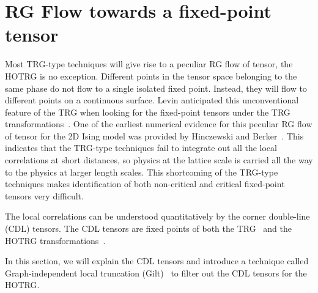 \documentclass[aps,prb,reprint,superscriptaddress,floatfix]{revtex4-2}
\begin{document}
\section{RG Flow towards a fixed-point tensor\label{fixRGflow}} Most
TRG-type techniques will give rise to a peculiar RG flow of tensor, the
HOTRG is no exception. Different points in the tensor space belonging to
the same phase do not flow to a single isolated fixed point. Instead,
they will flow to different points on a continuous surface. Levin
anticipated this unconventional feature of the TRG when looking for the
fixed-point tensors under the TRG transformations~\cite{LevinTalk}. One
of the earliest numerical evidence for this peculiar RG flow of tensor
for the 2D Ising model was provided by Hinczewski and
Berker~\cite{Berker2008}. This indicates that the TRG-type techniques
fail to integrate out all the local correlations at short distances, so
physics at the lattice scale is carried all the way to the physics at
larger length scales. This shortcoming of the TRG-type techniques makes
identification of both non-critical and critical fixed-point tensors
very difficult.
%

The local correlations can be understood quantitatively by the corner
double-line (CDL) tensors. The CDL tensors are fixed points of both the
TRG~\cite{LevinTalk,GuWen2009,tnr,gilts} and the HOTRG
transformations~\cite{hotrgfixpoint}.

In this section, we will explain the CDL tensors and introduce a
technique called Graph-independent local truncation (Gilt)~\cite{gilts}
to filter out the CDL tensors for the HOTRG.
\end{document}

